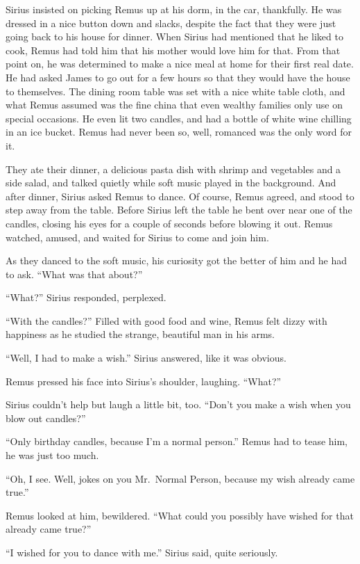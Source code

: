 \documentclass[12pt,twoside,openright]{memoir}
\begin{document}
Sirius insisted on picking Remus up at his dorm, in the car, thankfully. He was dressed in a nice button down and slacks, despite the fact that they were just going back to his house for dinner. When Sirius had mentioned that he liked to cook, Remus had told him that his mother would love him for that. From that point on, he was determined to make a nice meal at home for their first real date. He had asked James to go out for a few hours so that they would have the house to themselves. The dining room table was set with a nice white table cloth, and what Remus assumed was the fine china that even wealthy families only use on special occasions. He even lit two candles, and had a bottle of white wine chilling in an ice bucket. Remus had never been so, well, romanced was the only word for it. 

They ate their dinner, a delicious pasta dish with shrimp and vegetables and a side salad, and talked quietly while soft music played in the background. And after dinner, Sirius asked Remus to dance. Of course, Remus agreed, and stood to step away from the table. Before Sirius left the table he bent over near one of the candles, closing his eyes for a couple of seconds before blowing it out. Remus watched, amused, and waited for Sirius to come and join him.

As they danced to the soft music, his curiosity got the better of him and he had to ask. ``What was that about?''

``What?'' Sirius responded, perplexed.

``With the candles?'' Filled with good food and wine, Remus felt dizzy with happiness as he studied the strange, beautiful man in his arms.

``Well, I had to make a wish.'' Sirius answered, like it was obvious.

Remus pressed his face into Sirius's shoulder, laughing. ``What?'' 

Sirius couldn't help but laugh a little bit, too. ``Don't you make a wish when you blow out candles?''

``Only birthday candles, because I'm a normal person.'' Remus had to tease him, he was just too much.

``Oh, I see. Well, jokes on you Mr.\ Normal Person, because my wish already came true.''

Remus looked at him, bewildered. ``What could you possibly have wished for that already came true?''

``I wished for you to dance with me.'' Sirius said, quite seriously. 
\end{document}
